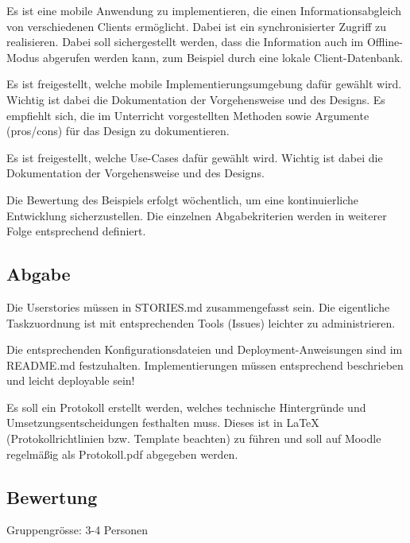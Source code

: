 Es ist eine mobile Anwendung zu implementieren, die einen Informationsabgleich von verschiedenen Clients ermöglicht. Dabei ist ein synchronisierter Zugriff zu realisieren. Dabei soll sichergestellt werden, dass die Information auch im Offline-Modus abgerufen werden kann, zum Beispiel durch eine lokale Client-Datenbank.\cite{syt-exercises:mobile-application}

Es ist freigestellt, welche mobile Implementierungsumgebung dafür gewählt wird. Wichtig ist dabei die Dokumentation der Vorgehensweise und des Designs. Es empfiehlt sich, die im Unterricht vorgestellten Methoden sowie Argumente (pros/cons) für das Design zu dokumentieren.\cite{syt-exercises:mobile-application}

Es ist freigestellt, welche Use-Cases dafür gewählt wird. Wichtig ist dabei die Dokumentation der Vorgehensweise und des Designs.\cite{syt-exercises:mobile-application}

Die Bewertung des Beispiels erfolgt wöchentlich, um eine kontinuierliche Entwicklung sicherzustellen. Die einzelnen Abgabekriterien werden in weiterer Folge entsprechend definiert.\cite{syt-exercises:mobile-application}

\subsection{Abgabe}

Die Userstories müssen in STORIES.md zusammengefasst sein. Die eigentliche Taskzuordnung ist mit entsprechenden Tools (Issues) leichter zu administrieren.\cite{syt-exercises:mobile-application}

Die entsprechenden Konfigurationsdateien und Deployment-Anweisungen sind im README.md festzuhalten. Implementierungen müssen entsprechend beschrieben und leicht deployable sein!\cite{syt-exercises:mobile-application}

Es soll ein Protokoll erstellt werden, welches technische Hintergründe und Umsetzungsentscheidungen festhalten muss. Dieses ist in LaTeX (Protokollrichtlinien bzw. Template beachten) zu führen und soll auf Moodle regelmäßig als Protokoll.pdf abgegeben werden.\cite{syt-exercises:mobile-application}

\subsection{Bewertung}

Gruppengrösse: 3-4 Personen\cite{syt-exercises:mobile-application}

